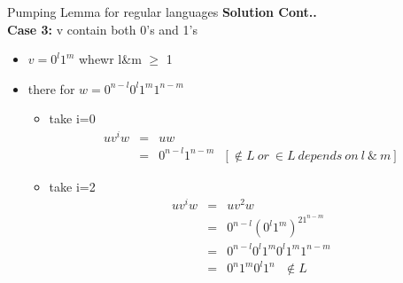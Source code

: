 \documentclass{beamer}
\begin{document}
\begin{frame}{Pumping Lemma for regular languages }
	\textbf{Solution Cont..}\\
	\textbf{Case 3:} v contain both  0's and 1's
	\begin{itemize}
		\item $v=0^l1^m$  whewr  l\&m $\geq$ 1
		\item there for $w=0^{n-l}0^l1^m1^{n-m}$
		\begin{itemize}
			\item take i=0
			\begin{eqnarray*}
				uv^iw &=& uw\\
				&=&0^{n-l}1^{n-m} \ \ \  [\notin L \ or\ \in L\ depends \ on\  l\ \&\  m]
			\end{eqnarray*}
		\item take i=2
		\begin{eqnarray*}
			uv^iw &=& uv^2w\\
			&=&0^{n-l}(0^l1^m)^21^{n-m} \\
			&=&0^{n-l}0^l1^m0^l1^m1^{n-m}\\
			&=&0^n1^m0^l1^n \ \ \ \notin L
		\end{eqnarray*}
		\end{itemize}
	\end{itemize}
\end{frame}
\end{document}
